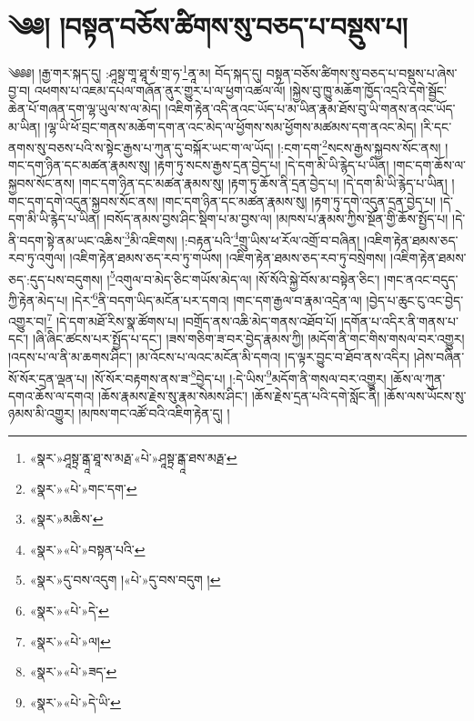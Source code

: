 \chapter{༄༅། །བསྟན་བཅོས་ཚིགས་སུ་བཅད་པ་བསྡུས་པ།}༄༅༅། །རྒྱ་གར་སྐད་དུ། :ཤཱསྟྲ་གཱ་ཐཱ་སཾ་གྲ་ཧ་\footnote{«སྣར་»ཤཱསྟྲ་ནྒཱ་ཐཱ་ས་མརྠ་«པེ་»ཤཱསྟྲ་ནྒཱ་ཐས་མརྠ་}ནཱ་མ། བོད་སྐད་དུ། བསྟན་བཅོས་ཚིགས་སུ་བཅད་པ་བསྡུས་པ་ཞེས་བྱ་བ། འཕགས་པ་འཇམ་དཔལ་གཞོན་ནུར་གྱུར་པ་ལ་ཕྱག་འཚལ་ལོ། །སྐྱེས་བུ་ཁྱུ་མཆོག་ཁྱོད་འདྲའི་དགེ་སྦྱོང་ཆེན་པོ་གཞན་དག་ལྷ་ཡུལ་ས་ལ་མེད། །འཇིག་རྟེན་འདི་ནའང་ཡོད་པ་མ་ཡིན་རྣམ་ཐོས་བུ་ཡི་གནས་ནའང་ཡོད་མ་ཡིན། །ལྷ་ཡི་ཕོ་བྲང་གནས་མཆོག་དག་ན་འང་མེད་ལ་ཕྱོགས་སམ་ཕྱོགས་མཚམས་དག་ནའང་མེད། །རི་དང་ནགས་སུ་བཅས་པའི་ས་སྟེང་རྒྱས་པ་ཀུན་དུ་བསྐོར་ཡང་ག་ལ་ཡོད། །:ངག་དག་\footnote{«སྣར་»«པེ་»གང་དག་}སངས་རྒྱས་སྐྱབས་སོང་ནས། །གང་དག་ཉིན་དང་མཚན་རྣམས་སུ། །རྟག་ཏུ་སངས་རྒྱས་དྲན་བྱེད་པ། །དེ་དག་མི་ཡི་རྙེད་པ་ཡིན། །གང་དག་ཆོས་ལ་སྐྱབས་སོང་ནས། །གང་དག་ཉིན་དང་མཚན་རྣམས་སུ། །རྟག་ཏུ་ཆོས་ནི་དྲན་བྱེད་པ། །དེ་དག་མི་ཡི་རྙེད་པ་ཡིན། །གང་དག་དགེ་འདུན་སྐྱབས་སོང་ནས། །གང་དག་ཉིན་དང་མཚན་རྣམས་སུ། །རྟག་ཏུ་དགེ་འདུན་དྲན་བྱེད་པ། །དེ་དག་མི་ཡི་རྙེད་པ་ཡིན། །བསོད་ནམས་བྱས་ཤིང་སྡིག་པ་མ་བྱས་ལ། །མཁས་པ་རྣམས་ཀྱིས་སྔོན་གྱི་ཆོས་སྤྱོད་པ། །དེ་ནི་བདག་སྟེ་ནམ་ཡང་འཆིས་\footnote{«སྣར་»མཆིས་}མི་འཇིགས། །:བརྟན་པའི་\footnote{«སྣར་»«པེ་»བསྟན་པའི་}གྲུ་ཡིས་ཕ་རོལ་འགྲོ་བ་བཞིན། །འཇིག་རྟེན་ཐམས་ཅད་རབ་ཏུ་འགུལ། །འཇིག་རྟེན་ཐམས་ཅད་རབ་ཏུ་གཡོས། །འཇིག་རྟེན་ཐམས་ཅད་རབ་ཏུ་བསྲེགས། །འཇིག་རྟེན་ཐམས་ཅད་:དུད་པས་བདུགས། །\footnote{«སྣར་»དུ་བས་འདུག །«པེ་»དུ་བས་བདུག །}འགུལ་བ་མེད་ཅིང་གཡོས་མེད་ལ། །སོ་སོའི་སྐྱེ་བོས་མ་བསྟེན་ཅིང་། །གང་ནའང་བདུད་ཀྱི་རྟེན་མེད་པ། །དེར་\footnote{«སྣར་»«པེ་»དེ་}ནི་བདག་ཡིད་མངོན་པར་དགའ། །གང་དག་རྒྱལ་བ་རྣམ་འདྲེན་ལ། །བྱེད་པ་ཆུང་ངུ་འང་བྱེད་འགྱུར་བ།\footnote{«སྣར་»«པེ་»ལ།} །དེ་དག་མཐོ་རིས་སྣ་ཚོགས་པ། །བགྲོད་ནས་འཆི་མེད་གནས་འཐོབ་པོ། །དགོན་པ་འདིར་ནི་གནས་པ་དང་། །ཞི་ཞིང་ཚངས་པར་སྤྱོད་པ་དང་། །ཟས་གཅིག་ཟ་བར་བྱེད་རྣམས་ཀྱི། །མདོག་ནི་གང་གིས་གསལ་བར་འགྱུར། །འདས་པ་ལ་ནི་མ་ཆགས་ཤིང་། །མ་འོངས་པ་ལའང་མངོན་མི་དགའ། །ད་ལྟར་བྱུང་བ་ཐོབ་ནས་འདིར། །ཤེས་བཞིན་སོ་སོར་དྲན་ལྡན་པ། །སོ་སོར་བརྟགས་ནས་ཟ་\footnote{«སྣར་»«པེ་»ཟད་}བྱེད་པ། །:དེ་ཡིས་\footnote{«སྣར་»«པེ་»དེ་ཡི་}མདོག་ནི་གསལ་བར་འགྱུར། །ཆོས་ལ་ཀུན་དགའ་ཆོས་ལ་དགའ། །ཆོས་རྣམས་རྗེས་སུ་རྣམ་སེམས་ཤིང་། །ཆོས་རྗེས་དྲན་པའི་དགེ་སློང་ནི། །ཆོས་ལས་ཡོངས་སུ་ཉམས་མི་འགྱུར། །མཁས་གང་འཚོ་བའི་འཇིག་རྟེན་དུ། །

